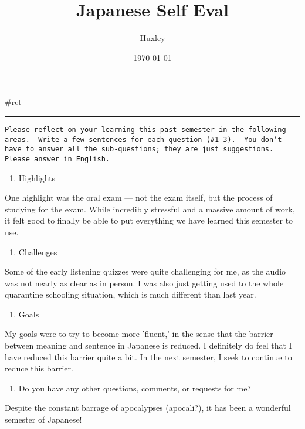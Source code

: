 \documentclass[letterpaper]{article}
\author{Huxley}
\date{\today}
\title{Japanese Self Eval}
\renewcommand{\tableofcontents}{}
\begin{document}
\tableofcontents

\#ret

\noindent\rule{\textwidth}{0.5pt}

\begin{verbatim}
Please reflect on your learning this past semester in the following areas.  Write a few sentences for each question (#1-3).  You don’t have to answer all the sub-questions; they are just suggestions.  Please answer in English.
\end{verbatim}

\begin{enumerate}
\item Highlights
\end{enumerate}

One highlight was the oral exam --- not the exam itself, but the process
of studying for the exam. While incredibly stressful and a massive
amount of work, it felt good to finally be able to put everything we
have learned this semester to use.

\begin{enumerate}
\item Challenges
\end{enumerate}

Some of the early listening quizzes were quite challenging for me, as
the audio was not nearly as clear as in person. I was also just getting
used to the whole quarantine schooling situation, which is much
different than last year.

\begin{enumerate}
\item Goals
\end{enumerate}

My goals were to try to become more 'fluent,' in the sense that the
barrier between meaning and sentence in Japanese is reduced. I
definitely do feel that I have reduced this barrier quite a bit. In the
next semester, I seek to continue to reduce this barrier.

\begin{enumerate}
\item Do you have any other questions, comments, or requests for me?
\end{enumerate}

Despite the constant barrage of apocalypses (apocali?), it has been a
wonderful semester of Japanese!
\end{document}
